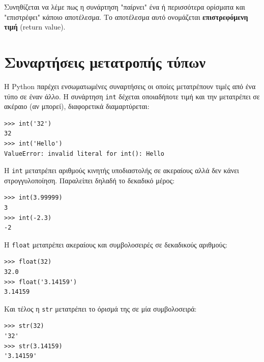 \documentclass[10pt]{book}
\begin{document}

Συνηθίζεται να λέμε πως η συνάρτηση "παίρνει" ένα ή περισσότερα ορίσματα και "επιστρέφει" κάποιο αποτέλεσμα. Το αποτέλεσμα αυτό ονομάζεται {\bf
επιστρεφόμενη τιμή} (return value).



\section{Συναρτήσεις μετατροπής τύπων}



Η  Python  παρέχει ενσωματωμένες συναρτήσεις οι οποίες
μετατρέπουν τιμές από ένα τύπο σε έναν άλλο. Η συνάρτηση {\tt int} δέχεται 
οποιαδήποτε τιμή και την μετατρέπει σε ακέραιο (αν μπορεί), διαφορετικά  διαμαρτύρεται:


\begin{verbatim}
>>> int('32')
32
>>> int('Hello')
ValueError: invalid literal for int(): Hello
\end{verbatim}
%

H {\tt int} μετατρέπει αριθμούς κινητής υποδιαστολής σε ακεραίους αλλά δεν κάνει στρογγυλοποίηση. Παραλείπει δηλαδή το δεκαδικό μέρος:


\begin{verbatim}
>>> int(3.99999)
3
>>> int(-2.3)
-2
\end{verbatim}
%

Η {\tt float} μετατρέπει ακεραίους και συμβολοσειρές σε δεκαδικούς
αριθμούς:

\begin{verbatim}
>>> float(32)
32.0
>>> float('3.14159')
3.14159
\end{verbatim}
%

Και τέλος η {\tt str} μετατρέπει το όρισμά της σε μία συμβολοσειρά:

\begin{verbatim}
>>> str(32)
'32'
>>> str(3.14159)
'3.14159'
\end{verbatim}
%
\end{document}
